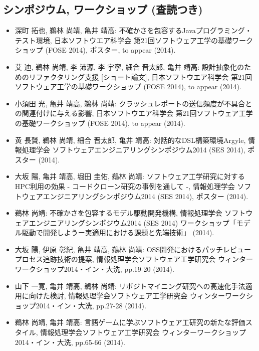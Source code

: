 \documentclass{jarticle}
\begin{document}
\subsection{シンポジウム, ワークショップ (査読つき)}

\begin{itemize}
\item 深町 拓也, 鵜林 尚靖, 亀井 靖高:
不確かさを包容するJavaプログラミング・テスト環境,
日本ソフトウエア科学会 第21回ソフトウェア工学の基礎ワークショップ (FOSE 2014), ポスター, to appear (2014).

\item 艾 迪, 鵜林 尚靖, 李 沛源, 李 宇寧, 細合 晋太郎, 亀井 靖高:
設計抽象化のためのリファクタリング支援 [ショート論文],
日本ソフトウエア科学会 第21回ソフトウェア工学の基礎ワークショップ (FOSE 2014), to appear (2014).

\item 小須田 光, 亀井 靖高, 鵜林 尚靖:
クラッシュレポートの送信頻度が不具合との関連付けに与える影響,
日本ソフトウエア科学会 第21回ソフトウェア工学の基礎ワークショップ (FOSE 2014), to appear (2014).

\item 黄 長贇, 鵜林 尚靖, 細合 晋太郎, 亀井 靖高:
対話的なDSL構築環境Argyle,
情報処理学会 ソフトウェアエンジニアリングシンポジウム2014 (SES 2014), ポスター (2014).

\item 大坂 陽, 亀井 靖高, 堀田 圭佑, 鵜林 尚靖:
ソフトウェア工学研究に対するHPC利用の効果 - コードクローン研究の事例を通して -,
情報処理学会 ソフトウェアエンジニアリングシンポジウム2014 (SES 2014), ポスター (2014).

\item 鵜林 尚靖:
不確かさを包容するモデル駆動開発機構,
情報処理学会 ソフトウェアエンジニアリングシンポジウム2014 (SES 2014) ワークショップ「モデル駆動で開発しようー実適用における課題と先端技術」 (2014).

\item 大坂 陽, 伊原 彰紀, 亀井 靖高, 鵜林 尚靖:
OSS開発におけるパッチレビュープロセス追跡技術の提案,
情報処理学会ソフトウェア工学研究会 ウィンターワークショップ2014・イン・大洗, pp.19-20 (2014).

\item 山下 一寛, 亀井 靖高, 鵜林 尚靖:
リポジトマイニング研究への高速化手法適用に向けた検討,
情報処理学会ソフトウェア工学研究会 ウィンターワークショップ2014・イン・大洗, pp.27-28 (2014).

\item 鵜林 尚靖, 亀井 靖高:
言語ゲームに学ぶソフトウェア工研究の新たな評価スタイル,
情報処理学会ソフトウェア工学研究会 ウィンターワークショップ2014・イン・大洗, pp.65-66 (2014).


\end{itemize}
\end{document}
